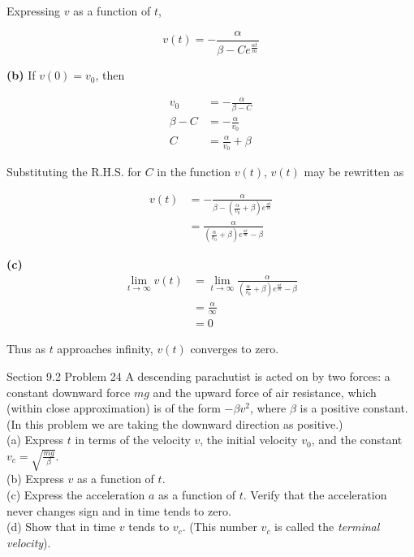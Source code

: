 \documentclass{article}
\begin{document}
    Expressing $v$ as a function of $t$,

    \[
        v(t) = -\frac{\alpha}{\beta - Ce^{\frac{\alpha t}{m}}}
    \]

    \textbf{(b)}
    If $v(0) = v_0$, then

    \begin{align*}
        v_0     &= -\frac{\alpha}{\beta - C} \\
        \beta - C   &= -\frac{\alpha}{v_0} \\
        C           &= \frac{\alpha}{v_0} + \beta
    \end{align*}

    Substituting the R.H.S. for $C$ in the function $v(t)$, $v(t)$ may be rewritten as

    \begin{align*}
        v(t) &= -\frac{\alpha}{\beta - \left(\frac{\alpha}{v_0} + \beta\right)e^{\frac{\alpha t}{m}}} \\
             &= \frac{\alpha}{\left(\frac{\alpha}{v_0}+\beta\right)e^{\frac{\alpha t}{m}}-\beta}
    \end{align*}

    \textbf{(c)}
    \begin{align*}
        \lim_{t\to\infty} v(t)  &= \lim_{t\to\infty} \frac{\alpha}{\left(\frac{\alpha}{v_0}+\beta\right)e^{\frac{\alpha t}{m}}-\beta} \\
                                &= \frac{\alpha}{\infty} \\
                                &= 0
    \end{align*}

    Thus as $t$ approaches infinity, $v(t)$ converges to zero.

    \begin{tbhtheorem}{Section 9.2 Problem 24}
        A descending parachutist is acted on by two forces: a constant downward force $mg$ and the upward force of air resistance, which (within close approximation) is of the form $-\beta v^2$, where $\beta$ is a
        positive constant. (In this problem we are taking the downward direction as positive.) \\
        (a) Express $t$ in terms of the velocity $v$, the initial velocity $v_0$, and the constant $v_c = \sqrt{\frac{mg}{\beta}}$. \\
        (b) Express $v$ as a function of $t$. \\
        (c) Express the acceleration $a$ as a function of $t$. Verify that the acceleration never changes sign and in time tends to zero. \\
        (d) Show that in time $v$ tends to $v_c$. (This number $v_c$ is called the \textit{terminal velocity}).
    \end{tbhtheorem}
\end{document}

